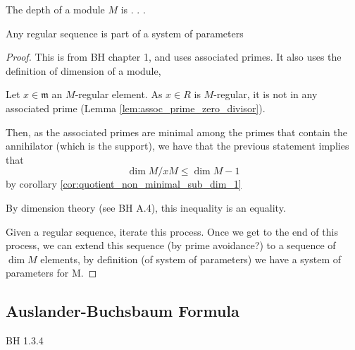 \begin{definition}
  \label{def:depth}
  The depth of a module $M$ is . . . 
\end{definition}

\begin{theorem}[BH 1.2.12]
  \label{thm:reg_seq_part_of_sys_param}
  Any regular sequence is part of a system of parameters
\end{theorem}

\begin{proof}

    This is 
    from BH chapter 1, and uses associated primes.
    It also uses the definition of dimension of a module,
    
    Let \(x \in \mathfrak{m}\) an \(M\)-regular element.
    As \(x \in R\) is \(M\)-regular,  
    it is not in any associated prime (Lemma \ref{lem:assoc_prime_zero_divisor}).
    
    Then, as the associated primes are minimal among the primes
    that contain the annihilator (which is the support),
    we have that the previous statement implies that
    \[
    \dim M / xM \leq \dim M - 1
    \] 
    by corollary \ref{cor:quotient_non_minimal_sub_dim_1}
    
    By dimension theory (see BH A.4), this inequality is an equality.
    
    Given a regular sequence, iterate this process. 
    Once we get to the end of this process, we can extend this sequence
    (by prime avoidance?)
    to a sequence of
    \(\dim M\) elements, by definition (of system of parameters) we have a system of
    parameters for M.

\end{proof}


\subsection{Auslander-Buchsbaum Formula}

\begin{lemma}
  \label{lem:module_assoc_maximal_tensor_free_summand}
  BH 1.3.4
\end{lemma}

